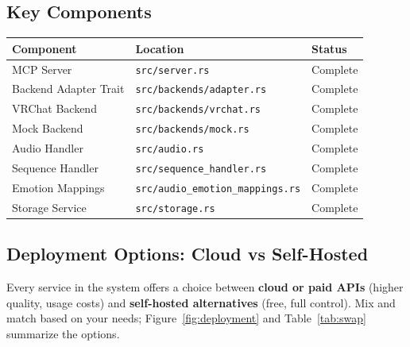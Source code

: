 \documentclass[11pt,letterpaper]{article}
\newcommand{\faCheck}{\ding{51}}
\begin{document}
\subsection{Key Components}

\begin{center}
\begin{tabular}{lll}
\toprule
\textbf{Component} & \textbf{Location} & \textbf{Status} \\
\midrule
MCP Server & \texttt{src/server.rs} & \textcolor{successgreen}{\faCheck} Complete \\
Backend Adapter Trait & \texttt{src/backends/adapter.rs} & \textcolor{successgreen}{\faCheck} Complete \\
VRChat Backend & \texttt{src/backends/vrchat.rs} & \textcolor{successgreen}{\faCheck} Complete \\
Mock Backend & \texttt{src/backends/mock.rs} & \textcolor{successgreen}{\faCheck} Complete \\
Audio Handler & \texttt{src/audio.rs} & \textcolor{successgreen}{\faCheck} Complete \\
Sequence Handler & \texttt{src/sequence\_handler.rs} & \textcolor{successgreen}{\faCheck} Complete \\
Emotion Mappings & \texttt{src/audio\_emotion\_mappings.rs} & \textcolor{successgreen}{\faCheck} Complete \\
Storage Service & \texttt{src/storage.rs} & \textcolor{successgreen}{\faCheck} Complete \\
\bottomrule
\end{tabular}
\end{center}

\subsection{Deployment Options: Cloud vs Self-Hosted}

Every service in the system offers a choice between \textbf{cloud or paid APIs} (higher quality, usage costs) and \textbf{self-hosted alternatives} (free, full control). Mix and match based on your needs; Figure~\ref{fig:deployment} and Table~\ref{tab:swap} summarize the options.
\end{document}
